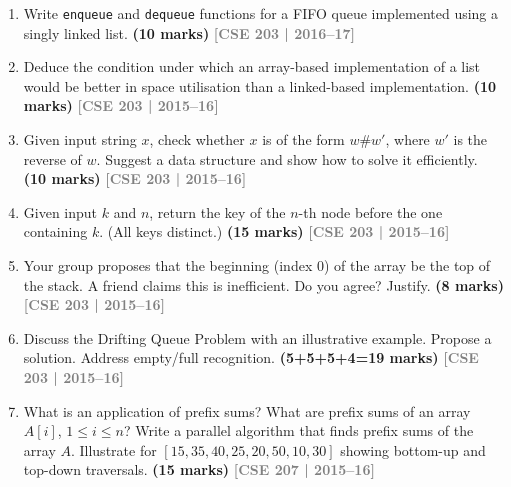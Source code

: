 \documentclass[12pt,a3paper]{article}
\newcommand{\yr}[1]{\hfill\textcolor{gray}{\small\textbf{[#1]}}}
\newcommand{\mk}[1]{\textcolor{orange!70!black}{\small\textbf{(#1 marks)}}}
\begin{document}
\begin{enumerate}
\item Write \texttt{enqueue} and \texttt{dequeue} functions for a FIFO queue
implemented using a singly linked list. \mk{10}
\yr{CSE 203 | 2016--17}

\item Deduce the condition under which an array-based implementation of a list
would be better in space utilisation than a linked-based implementation. \mk{10}
\yr{CSE 203 | 2015--16}

\item Given input string $x$, check whether $x$ is of the form $w\#w'$, where
$w'$ is the reverse of $w$. Suggest a data structure and show how to solve it
efficiently. \mk{10}
\yr{CSE 203 | 2015--16}

\item Given input $k$ and $n$, return the key of the $n$-th node before the
one containing $k$. (All keys distinct.) \mk{15}
\yr{CSE 203 | 2015--16}

\item Your group proposes that the beginning (index 0) of the array be the top
of the stack. A friend claims this is inefficient. Do you agree? Justify. \mk{8}
\yr{CSE 203 | 2015--16}

\item Discuss the Drifting Queue Problem with an illustrative example. Propose
a solution. Address empty/full recognition. \mk{5+5+5+4=19}
\yr{CSE 203 | 2015--16}

\item What is an application of prefix sums? What are prefix sums of an array
$A[i]$, $1 \leq i \leq n$? Write a parallel algorithm that finds prefix sums of
the array $A$. Illustrate for $[15,35,40,25,20,50,10,30]$ showing bottom-up and
top-down traversals. \mk{15}
\yr{CSE 207 | 2015--16}


\end{enumerate}
\end{document}
